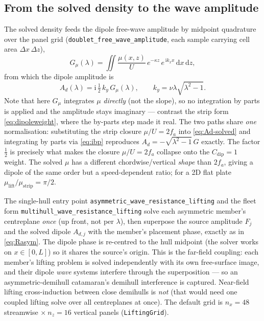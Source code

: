 \documentclass[11pt]{article}
\newcommand{\ii}{\mathrm{i}}
\newcommand{\dd}{\,\mathrm{d}}
\begin{document}
\subsection{From the solved density to the wave amplitude}
\label{sec:solvedamp}

The solved density feeds the dipole free-wave amplitude by midpoint quadrature
over the panel grid (\texttt{doublet\_free\_wave\_amplitude}, each sample
carrying cell area $\Delta x\,\Delta z$),
\begin{equation}
  G_\mu(\lambda) = \iint \frac{\mu(x,z)}{U}\,
    e^{-\kappa z}\, e^{\,\ii k_x x}\dd x\dd z,
\end{equation}
from which the dipole amplitude is
\begin{equation}
  \boxed{\;
  A_d(\lambda) = \ii\,\tfrac12\,k_y\,G_\mu(\lambda),
  \qquad k_y = \nu\lambda\sqrt{\lambda^2-1}. \;}
  \label{eq:Ad-solved}
\end{equation}
Note that here $G_\mu$ integrates $\mu$ \emph{directly} (not the slope), so no
integration by parts is applied and the amplitude stays imaginary --- contrast
the strip form \eqref{eq:dipoleweight}, where the by-parts step made it real.
The two paths share \emph{one} normalisation: substituting the strip closure
$\mu/U = 2 f_a$ into \eqref{eq:Ad-solved} and integrating by parts via
\eqref{eq:ibp} reproduces $A_d = -\sqrt{\lambda^2-1}\,G$ exactly. The factor
$\tfrac12$ is precisely what makes the closure $\mu/U = 2 f_a$ collapse onto the
$C_{\mathrm{dip}} = 1$ weight. The solved $\mu$ has a different
chordwise/vertical \emph{shape} than $2 f_a$, giving a dipole of the same order
but a speed-dependent ratio; for a 2D flat plate $\mu_{\mathrm{lift}} /
\mu_{\mathrm{strip}} = \pi/2$.

The single-hull entry point \texttt{asymmetric\_wave\_resistance\_lifting} and
the fleet form \texttt{multihull\_wave\_resistance\_lifting} solve each
asymmetric member's centreplane \emph{once} (up front, not per $\lambda$), then
superpose the source amplitude $F_j$ and the solved dipole $A_{d,j}$ with the
member's placement phase, exactly as in \eqref{eq:Rasym}. The dipole phase is
re-centred to the hull midpoint (the solver works on $x\in[0,L]$) so it shares
the source's origin. This is the far-field coupling: each member's lifting
problem is solved independently with its own free-surface image, and their
dipole \emph{wave} systems interfere through the superposition --- so an
asymmetric-demihull catamaran's demihull interference is captured. Near-field
lifting cross-induction between close demihulls is \emph{not} (that would need
one coupled lifting solve over all centreplanes at once). The default grid is
$n_x = 48$ streamwise $\times\ n_z = 16$ vertical panels (\texttt{LiftingGrid}).
\end{document}
